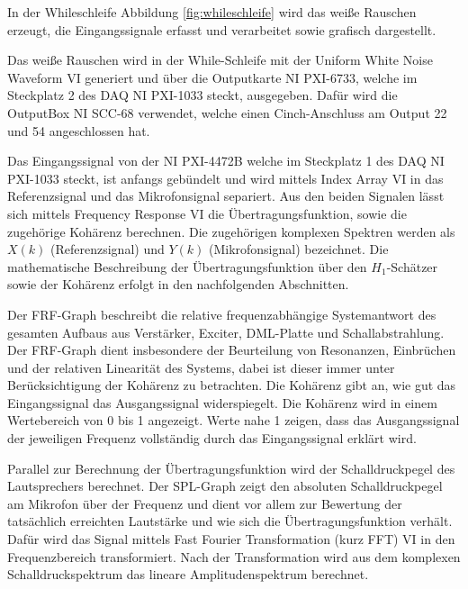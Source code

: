 In der Whileschleife Abbildung \ref{fig:whileschleife} wird das weiße Rauschen erzeugt, die Eingangssignale erfasst und verarbeitet sowie grafisch dargestellt. 

Das weiße Rauschen wird in der While-Schleife mit der Uniform White Noise Waveform VI generiert und über die Outputkarte NI PXI-6733, welche im Steckplatz 2 des DAQ NI PXI-1033 steckt, ausgegeben. Dafür wird die OutputBox NI SCC-68 verwendet, welche einen Cinch-Anschluss am Output 22 und 54 angeschlossen hat.

Das Eingangssignal von der NI PXI-4472B welche im Steckplatz 1 des DAQ NI PXI-1033 steckt, ist anfangs gebündelt und wird mittels Index Array VI in das Referenzsignal und das Mikrofonsignal separiert.
Aus den beiden Signalen lässt sich mittels Frequency Response VI die Übertragungsfunktion, sowie die zugehörige Kohärenz berechnen. Die zugehörigen komplexen Spektren werden als $X(k)$ (Referenzsignal) und $Y(k)$ (Mikrofonsignal) bezeichnet. Die mathematische Beschreibung der Übertragungsfunktion über den $H_1$-Schätzer sowie der Kohärenz erfolgt in den nachfolgenden Abschnitten.

Der FRF-Graph beschreibt die relative frequenzabhängige Systemantwort des gesamten Aufbaus aus Verstärker, Exciter, DML-Platte und Schallabstrahlung. Der FRF-Graph dient insbesondere der Beurteilung von Resonanzen, Einbrüchen und der relativen Linearität des Systems, dabei ist dieser immer unter Berücksichtigung der Kohärenz zu betrachten. Die Kohärenz gibt an, wie gut das Eingangssignal das Ausgangssignal widerspiegelt. Die Kohärenz wird in einem Wertebereich von 0 bis 1 angezeigt. Werte nahe 1 zeigen, dass das Ausgangssignal der jeweiligen Frequenz vollständig durch das Eingangssignal erklärt wird.


Parallel zur Berechnung der Übertragungsfunktion wird der Schalldruckpegel des Lautsprechers berechnet. Der SPL-Graph zeigt den absoluten Schalldruckpegel am Mikrofon über der Frequenz und dient vor allem zur Bewertung der tatsächlich erreichten Lautstärke und wie sich die Übertragungsfunktion verhält.
Dafür wird das Signal mittels Fast Fourier Transformation (kurz FFT) VI in den Frequenzbereich transformiert. Nach der Transformation wird aus dem komplexen Schalldruckspektrum das lineare Amplitudenspektrum berechnet.   






